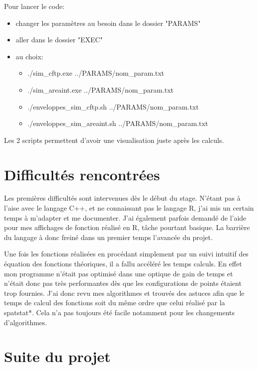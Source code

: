 \documentclass[stage2a]{tnreport}
\begin{document}
Pour lancer le code:
\begin{itemize}[label=\textbullet]
\item changer les paramètres au besoin dans le dossier "PARAMS"
\item aller dans le dossier "EXEC"
\item au choix:
    \begin{itemize}[label=\textbullet]
    \item ./sim\_cftp.exe ../PARAMS/nom\_param.txt
    \item ./sim\_areaint.exe ../PARAMS/nom\_param.txt
    \item ./enveloppes\_sim\_cftp.sh ../PARAMS/nom\_param.txt
    \item ./enveloppes\_sim\_areaint.sh ../PARAMS/nom\_param.txt
    \end{itemize}
\end{itemize}

Les 2 scripts permettent d'avoir une visualisation juste après les calculs.



\section{Difficultés rencontrées}

Les premières difficultés sont intervenues dès le début du stage. N'étant pas à l'aise avec le langage C++, et ne connaissant pas le langage R, j'ai mis un certain temps à m'adapter et me documenter. J'ai également parfois demandé de l'aide pour mes affichages de fonction réalisé en R, tâche pourtant basique. La barrière du langage à donc freiné dans un premier temps l'avancée du projet.

Une fois les fonctions réalisées en procédant simplement par un suivi intuitif des équation des fonctions théoriques, il a fallu accéléré les temps calculs. En effet mon programme n'était pas optimisé dans une optique de gain de temps et n'était donc pas très performantes dès que les configurations de points étaient trop fournies. J'ai donc revu mes algorithmes et trouvés des astuces afin que le temps de calcul des fonctions soit du même ordre que celui réalisé par la \gls{spatstat}*. Cela n'a pas toujours été facile notamment pour les changements d'algorithmes.


\section{Suite du projet}
\end{document}
